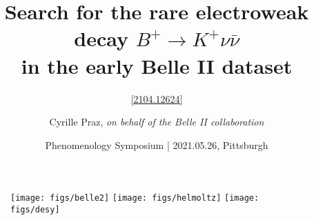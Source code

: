 \newcommand{\BKnn}{\ensuremath{B^+\to K^+\nu\bar{\nu}}\xspace}
\title[\BKnn at Belle II {[2104.12624]}]{Search for the rare  electroweak decay \BKnn \\ in the early Belle II dataset}
\subtitle{\href{https://arxiv.org/abs/2104.12624}{\color{blue!40!gray} [2104.12624]}}
\author[Cyrille Praz]{Cyrille Praz, \textit{on behalf of the Belle II collaboration}}
\date[2021.05.26]{Phenomenology Symposium | 2021.05.26, Pittsburgh}
\begin{frame}
\begin{figure}
\begin{center}
\texttt{[image: figs/belle2]}
\hspace{0.5cm}
\texttt{[image: figs/helmoltz]}
\hspace{0.5cm}
\texttt{[image: figs/desy]}
\end{center}
\end{figure}
\vspace{-0.75cm}
\titlepage
\end{frame}
